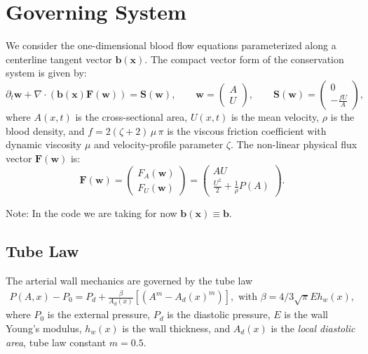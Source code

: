 \documentclass[11pt]{article}
\begin{document}
\section{Governing System}
We consider the one-dimensional blood flow equations parameterized along a centerline tangent vector $\bm b(\bm x)$. The compact vector form of the conservation system is given by:
\begin{equation}
  \partial_t \mathbf{w} + \nabla \cdot \left(\bm b(\bm{x})  \mathbf{F}(\mathbf{w})\right) = \mathbf{S}(\mathbf{w}), \qquad
  \mathbf{w} = \begin{pmatrix} A \\ U \end{pmatrix}, \qquad
  \mathbf{S}(\mathbf{w}) = \begin{pmatrix} 0 \\ - \frac{f U}{A} \end{pmatrix},
\end{equation}
where $A(x,t)$ is the cross-sectional area, $U(x,t)$ is the mean velocity, $\rho$ is the blood density, and
$f = 2(\zeta+2)\,\mu\,\pi$ is the viscous friction coefficient
with dynamic viscosity $\mu$ and velocity-profile parameter
$\zeta$. 
The non-linear physical flux vector $\mathbf{F}(\mathbf{w})$ is:
\begin{equation}
  \mathbf{F}(\mathbf{w}) = \begin{pmatrix} F_A(\mathbf{w}) \\ F_U(\mathbf{w}) \end{pmatrix} = \begin{pmatrix} A U \\ \frac{U^2}{2} + \frac{1}{\rho} P(A) \end{pmatrix}.
\end{equation}

Note: In the code we are taking for now $\bm b (\bm x) \equiv \bm b.$

\subsection{Tube Law}\label{sec:tube_law}
The arterial wall mechanics are governed by the tube law~\nocite{matthys2007pulse}
\begin{align*}
P(A,x) - P_0 = P_d + \frac{\beta}{A_d(x)}
\left[ (A^m - A_d(x)^m) \right], \text{ with }  \beta = 4/3 \sqrt{\pi} E h_w(x),
\end{align*}
where $P_0 $ is the external pressure, $P_d$ is the diastolic pressure,
$E$ is the wall Young's modulus,
$h_w(x)$ is the wall thickness, and
$A_d(x)$ is the \emph{local diastolic area}, tube law constant $m =0.5$.
\end{document}
